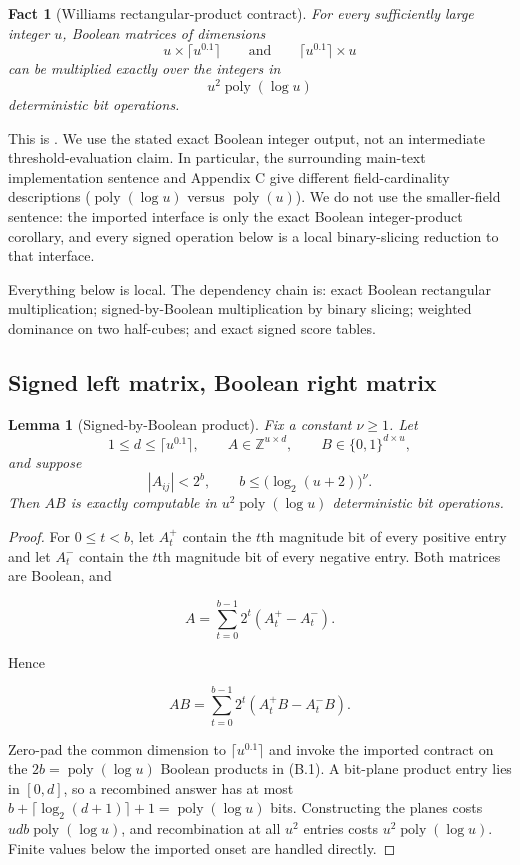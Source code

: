 \documentclass[11pt,letterpaper]{article}
\newtheorem{lemma}[theorem]{Lemma}
\newtheorem{fact}[theorem]{Fact}
\theoremstyle{definition}
\theoremstyle{remark}
\begin{document}
\begin{fact}[Williams rectangular-product contract]
\label{fact:williams-rectangular}
For every sufficiently
large integer \(u\), Boolean matrices of dimensions \[
u\times\lceil u^{0.1}\rceil
\qquad\text{and}\qquad
\lceil u^{0.1}\rceil\times u
\] can be multiplied exactly over the integers in \[
u^2\operatorname{poly}(\log u)
\] deterministic bit operations.
\end{fact}

This is \cite[Corollary 4.4 and Appendix C, Corollary C.2]{WilACC14}. We
use the stated exact Boolean integer output, not an intermediate
threshold-evaluation claim. In particular, the surrounding main-text
implementation sentence and Appendix C give different field-cardinality
descriptions (\(\operatorname{poly}(\log u)\) versus
\(\operatorname{poly}(u)\)). We do not use the smaller-field sentence:
the imported interface is only the exact Boolean integer-product
corollary, and every signed operation below is a local binary-slicing
reduction to that interface.

Everything below is local. The dependency chain is: exact Boolean
rectangular multiplication; signed-by-Boolean multiplication by binary
slicing; weighted dominance on two half-cubes; and exact signed score
tables.

\subsection{Signed left matrix, Boolean right
matrix}\label{b2-signed-left-matrix-boolean-right-matrix}

\begin{lemma}[Signed-by-Boolean product]
\label{lem:signed-boolean-product}
Fix a constant
\(\nu\ge1\). Let \[
1\le d\le\lceil u^{0.1}\rceil,
\qquad
A\in\mathbb Z^{u\times d},
\qquad
B\in\{0,1\}^{d\times u},
\] and suppose \[
|A_{ij}|<2^b,
\qquad
b\le\bigl(\log_2(u+2)\bigr)^\nu.
\] Then \(AB\) is exactly computable in
\(u^2\operatorname{poly}(\log u)\) deterministic bit operations.
\end{lemma}

\begin{proof} For \(0\le t<b\), let \(A_t^+\) contain the \(t\)th
magnitude bit of every positive entry and let \(A_t^-\) contain the
\(t\)th magnitude bit of every negative entry. Both matrices are
Boolean, and

\[
A
{}={}
\sum_{t=0}^{b-1}2^t(A_t^+-A_t^-).
\]

Hence

\[
AB
{}={}
\sum_{t=0}^{b-1}2^t(A_t^+B-A_t^-B).
\tag{B.1}
\]

Zero-pad the common dimension to \(\lceil u^{0.1}\rceil\) and invoke the
imported contract on the \(2b=\operatorname{poly}(\log u)\) Boolean
products in (B.1). A bit-plane product entry lies in \([0,d]\), so a
recombined answer has at most
\(b+\lceil\log_2(d+1)\rceil+1=\operatorname{poly}(\log u)\) bits.
Constructing the planes costs \(udb\operatorname{poly}(\log u)\), and
recombination at all \(u^2\) entries costs
\(u^2\operatorname{poly}(\log u)\). Finite values below the imported
onset are handled directly. \end{proof}
\end{document}

